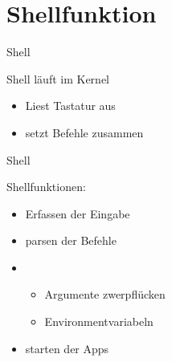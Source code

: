 \section{Shellfunktion}


\begin{frame}{Shell}
    \begin{Large}
        Shell läuft im Kernel
    \end{Large}
    \vspace{15pt}

    \begin{itemize}
        \item Liest Tastatur aus
        \item setzt Befehle zusammen
    \end{itemize}
    
\end{frame}


\begin{frame}{Shell}
    \begin{Large}
        Shellfunktionen: 
    \end{Large}
    \vspace{15pt} 
    
    \begin{itemize}
        \item Erfassen der Eingabe
        \item parsen der Befehle
        \item \begin{itemize}
            \item Argumente zwerpflücken
            \item Environmentvariabeln
        \end{itemize}
        \item starten der Apps
    \end{itemize}
\end{frame}

